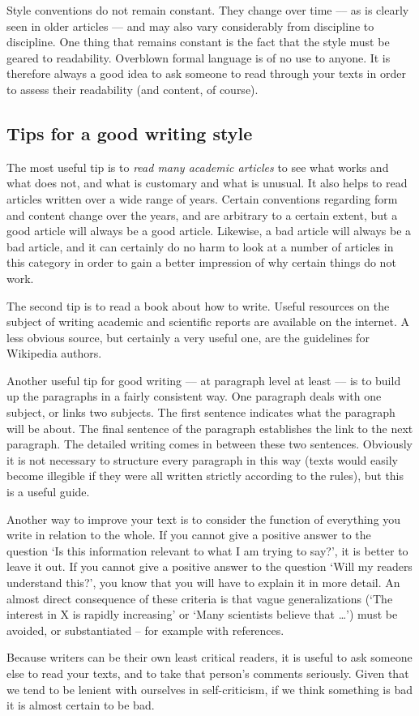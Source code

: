 Style conventions do not remain constant.
They change over time –-- as is clearly seen in older articles –-- and may also vary considerably from discipline to discipline.
One thing that remains constant is the fact that the style must be geared to readability.
Overblown formal language is of no use to anyone.
It is therefore always a good idea to ask someone to read through your texts in order to assess their readability (and content, of course).

\subsection{Tips for a good writing style}\label{sec:_tips_for_writing}
The most useful tip is to \emph{read many academic articles} to see what works and what does not, and what is customary and what is unusual.
It also helps to read articles written over a wide range of years.
Certain conventions regarding form and content change over the years, and are arbitrary to a certain extent, but a good article will always be a good article.
Likewise, a bad article will always be a bad article, and it can certainly do no harm to look at a number of articles in this category in order to gain a better impression of why certain things do not work.

The second tip is to read a book about how to write.
Useful resources on the subject of writing academic and scientific reports are available on the internet. A less obvious source, but certainly a very useful one, are the guidelines for Wikipedia authors.

Another useful tip for good writing –-- at paragraph level at least --– is to build up the paragraphs in a fairly consistent way.
One paragraph deals with one subject, or links two subjects.
The first sentence indicates what the paragraph will be about.
The final sentence of the paragraph establishes the link to the next paragraph.
The detailed writing comes in between these two sentences.
Obviously it is not necessary to structure every paragraph in this way (texts would easily become illegible if they were all written strictly according to the rules), but this is a useful guide.

Another way to improve your text is to consider the function of everything you write in relation to the whole.
If you cannot give a positive answer to the question `Is this information relevant to what I am trying to say?', it is better to leave it out.
If you cannot give a positive answer to the question `Will my readers understand this?', you know that you will have to explain it in more detail.
An almost direct consequence of these criteria is that vague generalizations (`The interest in X is rapidly increasing' or `Many scientists believe that \ldots') must be avoided, or substantiated – for example with references.

Because writers can be their own least critical readers, it is useful to ask someone else to read your texts, and to take that person's comments seriously.
Given that we tend to be lenient with ourselves in self-criticism, if we think something is bad it is almost certain to be bad.
